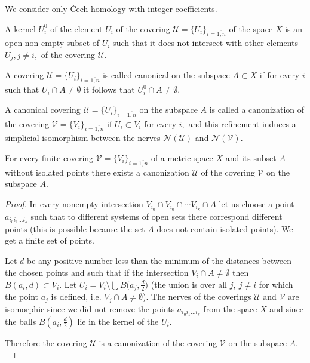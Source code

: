 We consider only {\v C}ech homology with integer coefficients.

\begin{dfn}
A {\rm kernel} $U_i^0$ of the element $U_i$ of the covering
$\mathcal{U} = \{U_i\}_{i=\overline{1,n}}$ of the space $X$ is an
open non-empty subset of $U_i$ such that it does not intersect
with other elements $U_j, j \neq i,$ of the covering
$\mathcal{U}.$
\end{dfn}

\begin{dfn}
A covering $\mathcal{U} = \{U_i\}_{i=\overline{1,n}}$ is called
{\rm canonical} on the subspace $A\subset X$ if for every $i$ such
that $U_i\cap A \neq \emptyset$ it follows that $U_i^0\cap A \neq
\emptyset.$
\end{dfn}

\begin{dfn}
A canonical covering $\mathcal{U} = \{U_i\}_{i=\overline{1,n}}$
on the subspace $A$ is called a {\rm canonization} of the covering
$\mathcal{V} = \{V_i\}_{i=\overline{1,n}}$ if $U_i \subset V_i$
for every $i,$ and this refinement induces a simplicial
isomorphism between the nerves $\mathcal{N}(\mathcal{U})$ and
$\mathcal{N}(\mathcal{V}).$
\end{dfn}

\begin{lmm}\label{canonization}
For every finite covering $\mathcal{V} =
\{V_i\}_{i=\overline{1,n}}$ of a metric space $X$ and its subset
$A$ without isolated points there exists a canonization
$\mathcal{U}$ of the covering $\mathcal{V}$ on the subspace $A.$
\end{lmm}

\begin{proof}
In every nonempty intersection $V_{i_0}\cap V_{i_0}\cap\cdots
V_{i_k}\cap A$ let us choose a point $a_{i_0i_1\dots i_k}$ such
that to different systems of open sets there correspond different
points (this is possible because the set $A$ does not contain
isolated points). We get a finite set of points. 

Let $d$ be any
positive number less than the minimum of the distances between the
chosen points and such that if the intersection $V_i\cap A \neq
\emptyset$ then $B(a_i, d)\subset V_i.$ Let $U_i = V_i \setminus
\bigcup \overline{B(a_j,\frac{d}{2}})$ (the union is over all $j,
\ j \neq i$ for which the point $a_j$ is defined, i.e. $V_j\cap A
\neq \emptyset$). The nerves of the coverings $\mathcal{U}$ and
$\mathcal{V}$ are isomorphic since we did not remove the points
$a_{i_0i_1\dots i_k}$ from the space  $X$ and since the balls
$B(a_i, \frac{d}{2})$ lie in the kernel of the $U_i.$ 

Therefore
the covering $\mathcal{U}$ is a canonization of the covering
$\mathcal{V}$ on the subspace $A.$
\end{proof}


